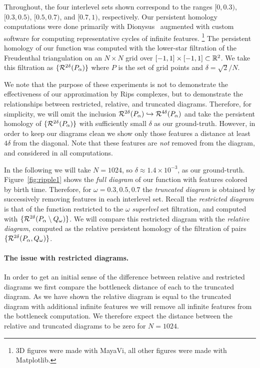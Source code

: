 Throughout, the four interlevel sets shown correspond to the ranges $[0, 0.3)$, $[0.3, 0.5)$, $[0.5, 0.7)$, and $[0.7, 1)$, respectively.
Our persistent homology computations were done primarily with Dionysus~\cite{morozov12dionysus} augmented with custom software for computing representative cycles of infinite features.
\footnote{3D figures were made with MayaVi, all other figures were made with Matplotlib.}
The persistent homology of our function was computed with the lower-star filtration of the Freudenthal triangulation on an $N\times N$ grid over $[-1,1]\times[-1,1]\subset\mathbb{R}^2$.
We take this filtration as $\{\mathcal{R}^{2\delta}(P_\alpha)\}$ where $P$ is the set of grid points and $\delta = \sqrt{2} / N$.

We note that the purpose of these experiments is not to demonstrate the effectiveness of our approximation by Rips complexes, but to demonstrate the relationships between restricted, relative, and truncated diagrams.
Therefore, for simplicity, we will omit the inclusion $\mathcal{R}^{2\delta}(P_\alpha)\hookrightarrow\mathcal{R}^{4\delta}(P_\alpha)$ and take the persistent homology of $\{\mathcal{R}^{2\delta}(P_\alpha)\}$ with sufficiently small $\delta$ as our ground-truth.
However, in order to keep our diagrams clean we show only those features a distance at least $4\delta$ from the diagonal.
Note that these features are \emph{not} removed from the diagram, and considered in all computations.

In the following we will take $N = 1024$, so $\delta\approx 1.4\times 10^{-3}$, as our ground-truth.
Figure~\ref{fig:ripple1} shows the \emph{full diagram} of our function with features colored by birth time.
Therefore, for $\omega = 0.3, 0.5, 0.7$ the \emph{truncated diagram} is obtained by successively removing features in each interlevel set.
Recall the \emph{restricted diagram} is that of the function restricted to the $\omega$ \emph{superlvel} set filtration, and computed with $\{\mathcal{R}^{2\delta}(P_\alpha\setminus Q_\omega)\}$.
We will compare this restricted diagram with the \emph{relative diagram}, computed as the relative persistent homology of the filtration of pairs $\{\mathcal{R}^{2\delta}(P_\alpha, Q_\omega)\}$.

\paragraph*{The issue with restricted diagrams.}

In order to get an initial sense of the difference between relative and restricted diagrams we first compare the bottleneck distance of each to the truncated diagram.
As we have shown the relative diagram is equal to the truncated diagram with additional infinite features we will remove all infinite features from the bottleneck computation.
We therefore expect the distance between the relative and truncated diagrams to be zero for $N=1024$.

